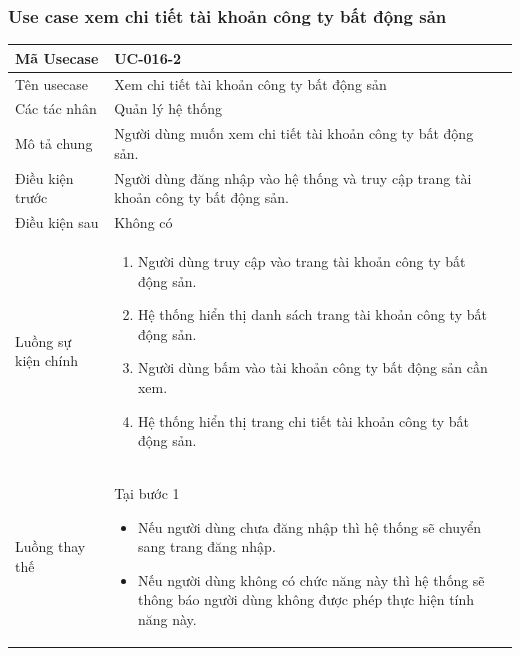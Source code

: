 \documentclass[12pt,a4paper]{article}
\begin{document}
    \subsubsection*{Use case xem chi tiết tài khoản công ty bất động sản }
    \begin{table}[H]
        \centering
        \begin{tabular}{|p{3.5cm}|p{11.5cm}|c|}
            \hline
            Mã Usecase      & UC-016-2                                                                            \\
            \hline
            Tên usecase     & Xem chi tiết tài khoản công ty bất động sản                                         \\
            \hline
            Các tác nhân    & Quản lý hệ thống                                                                    \\
            \hline
            Mô tả chung     & Người dùng muốn xem chi tiết tài khoản công ty bất động sản.                        \\
            \hline

            Điều kiện trước & Người dùng đăng nhập vào hệ thống và truy cập trang tài khoản công ty bất động sản. \\
            \hline

            Điều kiện sau   & Không có                                                                            \\
            \hline

            Luồng sự kiện chính & \vspace{-.8cm}\begin{enumerate}
                                                    \item Người dùng truy cập vào trang tài khoản công ty bất động sản.
                                                    \item Hệ thống hiển thị danh sách trang tài khoản công ty bất động sản.
                                                    \item Người dùng bấm vào tài khoản công ty bất động sản cần xem.
                                                    \item Hệ thống hiển thị trang chi tiết tài khoản công ty bất động sản.
            \end{enumerate}
            \\
            \hline
            Luồng thay thế & Tại bước 1\newline
            \vspace{-.8cm}\begin{itemize}
                              \item Nếu người dùng chưa đăng nhập thì hệ thống sẽ chuyển sang trang đăng nhập.
                              \item  Nếu người dùng không có chức năng này thì hệ thống sẽ thông báo người dùng không được phép thực hiện tính năng này.
            \end{itemize}


\end{tabular}
\end{table}
\end{document}
